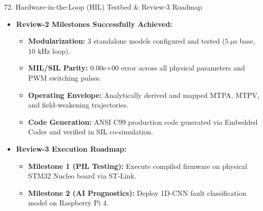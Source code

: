 \documentclass[aspectratio=169]{beamer}
\begin{document}
\begin{frame}{72. Hardware-in-the-Loop (HIL) Testbed \& Review-3 Roadmap}
    \begin{itemize}
        \item \textbf{Review-2 Milestones Successfully Achieved:}
        \begin{itemize}
            \item \textbf{Modularization:} 3 standalone models configured and tested ($5\ \mu\text{s}$ base, $10\text{ kHz}$ loop).
            \item \textbf{MIL/SIL Parity:} $0.00\text{e+}00$ error across all physical parameters and PWM switching pulses.
            \item \textbf{Operating Envelope:} Analytically derived and mapped MTPA, MTPV, and field-weakening trajectories.
            \item \textbf{Code Generation:} ANSI C99 production code generated via Embedded Coder and verified in SIL co-simulation.
        \end{itemize}
        \item \textbf{Review-3 Execution Roadmap:}
        \begin{itemize}
            \item \textbf{Milestone 1 (PIL Testing):} Execute compiled firmware on physical STM32 Nucleo board via ST-Link.
            \item \textbf{Milestone 2 (AI Prognostics):} Deploy 1D-CNN fault classification model on Raspberry Pi 4.
        \end{itemize}
    \end{itemize}
\end{frame}
\end{document}
